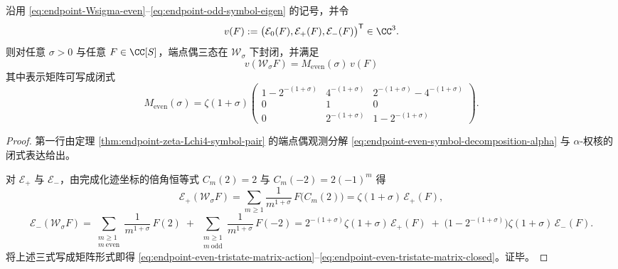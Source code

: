 \begin{proposition}[端点偶三态的不变子表示与显式矩阵化]\label{prop:endpoint-even-tristate-matrix}
沿用 \eqref{eq:endpoint-Wsigma-even}--\eqref{eq:endpoint-odd-symbol-eigen} 的记号，并令
\[
v(F):=\bigl(\mathcal E_{0}(F),\mathcal E_{+}(F),\mathcal E_{-}(F)\bigr)^{\mathsf T}\in\CC^{3}.
\]
则对任意 \(\sigma>0\) 与任意 \(F\in\CC[S]\)，端点偶三态在 \(\mathcal W_\sigma\) 下封闭，并满足
\begin{equation}\label{eq:endpoint-even-tristate-matrix-action}
\boxed{\;
v(\mathcal W_{\sigma}F)=M_{\mathrm{even}}(\sigma)\,v(F)\;}
\end{equation}
其中表示矩阵可写成闭式
\begin{equation}\label{eq:endpoint-even-tristate-matrix-closed}
\boxed{\;
M_{\mathrm{even}}(\sigma)
=\zeta(1+\sigma)
\begin{pmatrix}
1-2^{-(1+\sigma)} & 4^{-(1+\sigma)} & 2^{-(1+\sigma)}-4^{-(1+\sigma)}\\
0&1&0\\
0&2^{-(1+\sigma)}&1-2^{-(1+\sigma)}
\end{pmatrix}. \;}
\end{equation}
\end{proposition}

\begin{proof}
第一行由定理 \ref{thm:endpoint-zeta-Lchi4-symbol-pair} 的端点偶观测分解 \eqref{eq:endpoint-even-symbol-decomposition-alpha} 与 \(\alpha\)-权核的闭式表达给出。
\par
对 \(\mathcal E_{+}\) 与 \(\mathcal E_{-}\)，由完成化迹坐标的倍角恒等式 \(C_m(2)=2\) 与 \(C_m(-2)=2(-1)^m\) 得
\[
\mathcal E_{+}(\mathcal W_\sigma F)
=\sum_{m\ge 1}\frac{1}{m^{1+\sigma}}\,F\!\bigl(C_m(2)\bigr)
=\zeta(1+\sigma)\,\mathcal E_{+}(F),
\]
\[
\mathcal E_{-}(\mathcal W_\sigma F)
=\sum_{\substack{m\ge 1\\ m\ \mathrm{even}}}\frac{1}{m^{1+\sigma}}\,F(2)
\;+\;
\sum_{\substack{m\ge 1\\ m\ \mathrm{odd}}}\frac{1}{m^{1+\sigma}}\,F(-2)
=2^{-(1+\sigma)}\zeta(1+\sigma)\,\mathcal E_{+}(F)
\;+\;\bigl(1-2^{-(1+\sigma)}\bigr)\zeta(1+\sigma)\,\mathcal E_{-}(F).
\]
将上述三式写成矩阵形式即得 \eqref{eq:endpoint-even-tristate-matrix-action}--\eqref{eq:endpoint-even-tristate-matrix-closed}。证毕。
\end{proof}

